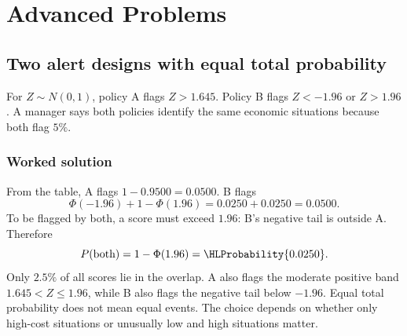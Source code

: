 \section{Advanced Problems}\label{sec:advanced}

\subsection{Two alert designs with equal total probability}\label{prob:sec:advanced0}
For $Z\sim N(0,1)$, policy A flags $Z>1.645$. Policy B flags $Z<-1.96$ or $Z>1.96$. A manager says both policies identify the same economic situations because both flag $5\%$.
\subsubsection*{Worked solution}\label{sol:sec:advanced0}
From the table, A flags $1-0.9500=0.0500$. B flags
\[
\Phi(-1.96)+1-\Phi(1.96)=0.0250+0.0250=0.0500.
\]
To be flagged by both, a score must exceed $1.96$: B's negative tail is outside A. Therefore
\[
P(\text{both})=1-\Phi(1.96)=\HLProbability{0.0250}.
\]
Only $2.5\%$ of all scores lie in the overlap. A also flags the moderate positive band $1.645<Z\le1.96$, while B also flags the negative tail below $-1.96$. Equal total probability does not mean equal events. The choice depends on whether only high-cost situations or unusually low and high situations matter.



